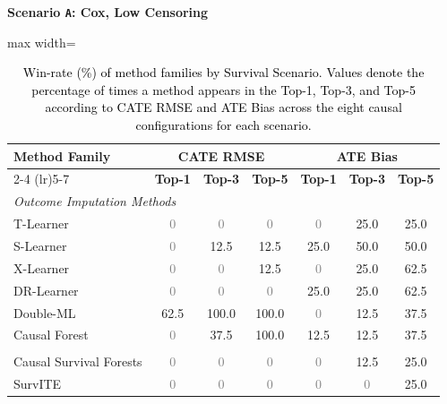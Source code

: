 \documentclass{article} %
\newcommand{\rebuttal}[1]{\textcolor{black}{#1}}
\begin{document}
\begin{table}[t]
\centering
\caption{\rebuttal{Win-rate (\%) of method families by Survival Scenario. 
Values denote the percentage of times a method appears in the Top-1, Top-3, and Top-5 
according to CATE RMSE and ATE Bias across the eight causal configurations for each scenario.}}
\label{tab:scenario-winrates}

\begin{minipage}{0.48\textwidth}
\centering
\textbf{Scenario \texttt{A}: Cox, Low Censoring}\\[0.25em]
\begin{adjustbox}{max width=\textwidth}
\begin{tabular}{lccc@{\hspace{18pt}}ccc}
\toprule
\multirow{2}{*}{\textbf{Method Family}} &
\multicolumn{3}{c}{\textbf{CATE RMSE}} &
\multicolumn{3}{c}{\textbf{ATE Bias}} \\
\cmidrule(lr){2-4} \cmidrule(lr){5-7}
& \textbf{Top-1} & \textbf{Top-3} & \textbf{Top-5}
& \textbf{Top-1} & \textbf{Top-3} & \textbf{Top-5} \\
\midrule
\multicolumn{7}{l}{\textit{Outcome Imputation Methods}} \\
T-Learner               & \textcolor{gray}{0}   & \textcolor{gray}{0}   & \textcolor{gray}{0}   & \textcolor{gray}{0}   & 25.0 & 25.0 \\
S-Learner               & \textcolor{gray}{0}   & 12.5 & 12.5 & 25.0 & 50.0 & 50.0 \\
X-Learner               & \textcolor{gray}{0}   & \textcolor{gray}{0}   & 12.5 & \textcolor{gray}{0}   & 25.0 & 62.5 \\
DR-Learner              & \textcolor{gray}{0}   & \textcolor{gray}{0}   & \textcolor{gray}{0}   & 25.0 & 25.0 & 62.5 \\
Double-ML               & 62.5 & 100.0 & 100.0 & \textcolor{gray}{0}   & 12.5 & 37.5 \\
Causal Forest           & \textcolor{gray}{0}   & 37.5 & 100.0 & 12.5 & 12.5 & 37.5 \\
\addlinespace %
\multicolumn{7}{l}{\textit{Direct-Survival CATE Methods}} \\
Causal Survival Forests  & \textcolor{gray}{0}   & \textcolor{gray}{0}   & \textcolor{gray}{0}   & \textcolor{gray}{0}   & 12.5 & 25.0 \\
SurvITE                 & \textcolor{gray}{0}   & \textcolor{gray}{0}   & \textcolor{gray}{0}   & \textcolor{gray}{0}   & \textcolor{gray}{0}   & 25.0 \\

\end{tabular}
\end{adjustbox}
\end{minipage}
\end{table}
\end{document}
